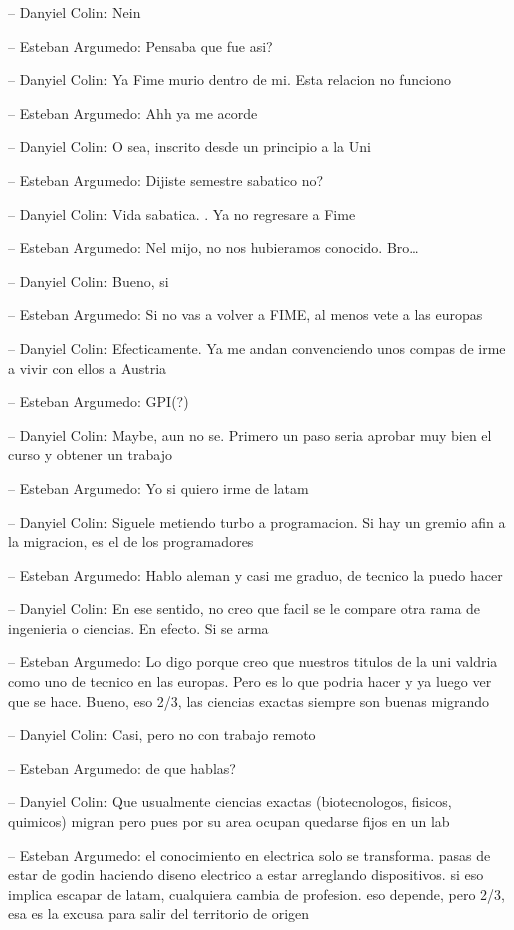 -- Danyiel Colin: Nein

-- Esteban Argumedo: Pensaba que fue asi?

-- Danyiel Colin: Ya Fime murio dentro de mi. Esta relacion no funciono

-- Esteban Argumedo: Ahh ya me acorde

-- Danyiel Colin: O sea, inscrito desde un principio a la Uni

-- Esteban Argumedo: Dijiste semestre sabatico no?

-- Danyiel Colin: Vida sabatica. . Ya no regresare a Fime

-- Esteban Argumedo: Nel mijo, no nos hubieramos conocido. Bro\ldots{}

-- Danyiel Colin: Bueno, si

-- Esteban Argumedo: Si no vas a volver a FIME, al menos vete a las
europas

-- Danyiel Colin: Efecticamente. Ya me andan convenciendo unos compas de
irme a vivir con ellos a Austria

-- Esteban Argumedo: GPI(?)

-- Danyiel Colin: Maybe, aun no se. Primero un paso seria aprobar muy
bien el curso y obtener un trabajo

-- Esteban Argumedo: Yo si quiero irme de latam

-- Danyiel Colin: Siguele metiendo turbo a programacion. Si hay un
gremio afin a la migracion, es el de los programadores

-- Esteban Argumedo: Hablo aleman y casi me graduo, de tecnico la puedo
hacer

-- Danyiel Colin: En ese sentido, no creo que facil se le compare otra
rama de ingenieria o ciencias. En efecto. Si se arma

-- Esteban Argumedo: Lo digo porque creo que nuestros titulos de la uni
valdria como uno de tecnico en las europas. Pero es lo que podria hacer
y ya luego ver que se hace. Bueno, eso 2/3, las ciencias exactas siempre
son buenas migrando

-- Danyiel Colin: Casi, pero no con trabajo remoto

-- Esteban Argumedo: de que hablas?

-- Danyiel Colin: Que usualmente ciencias exactas (biotecnologos,
fisicos, quimicos) migran pero pues por su area ocupan quedarse fijos en
un lab

-- Esteban Argumedo: el conocimiento en electrica solo se transforma.
pasas de estar de godin haciendo diseno electrico a estar arreglando
dispositivos. si eso implica escapar de latam, cualquiera cambia de
profesion. eso depende, pero 2/3, esa es la excusa para salir del
territorio de origen

